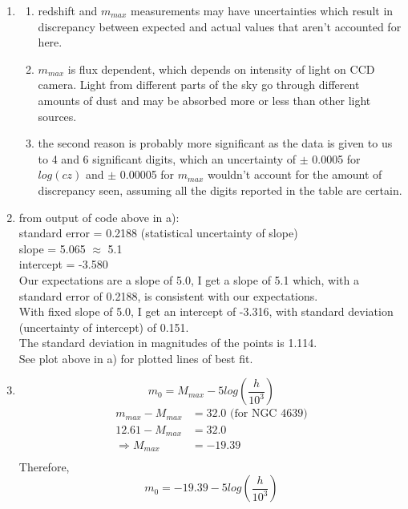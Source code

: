\documentclass[10pt,letterpaper]{article}
\begin{document}
\begin{enumerate}
\begin{enumerate}
\item
\begin{enumerate}
\item redshift and $m_{max}$ measurements may have uncertainties which result in discrepancy between expected and actual values that aren't accounted for here.\\
\item $m_{max}$ is flux dependent, which depends on intensity of light on CCD camera. Light from different parts of the sky go through different amounts of dust and may be absorbed more or less than other light sources.\\
\item the second reason is probably more significant as the data is given to us to 4 and 6 significant digits, which an uncertainty of $\pm$ 0.0005 for $log(cz)$ and $\pm$ 0.00005 for $m_{max}$ wouldn't account for the amount of discrepancy seen, assuming all the digits reported in the table are certain.\\
\end{enumerate}

\item from output of code above in a):\\

standard error = 0.2188 (statistical uncertainty of slope)\\
slope = 5.065 $\approx$ 5.1\\
intercept = -3.580\\

Our expectations are a slope of 5.0, I get a slope of 5.1 which, with a standard error of 0.2188, is consistent with our expectations.\\

With fixed slope of 5.0, I get an intercept of -3.316, with standard deviation (uncertainty of intercept) of 0.151.\\

The standard deviation in magnitudes of the points is 1.114.\\

See plot above in a) for plotted lines of best fit.\\

\item \begin{equation}\nonumber
m_0 = M_{max} - 5 log \left(\frac{h}{10^3}\right)
\end{equation}
\begin{equation}\nonumber
\begin{split}
m_{max} - M_{max} & = 32.0 \text{ (for NGC 4639)}\\
12.61 - M_{max} & = 32.0\\
\Rightarrow M_{max} & = -19.39\\
\end{split}
\end{equation}
Therefore, 
\begin{equation}\nonumber
m_0 = -19.39 - 5 log\left(\frac{h}{10^3}\right)
\end{equation}


\end{enumerate}
\end{enumerate}
\end{document}
